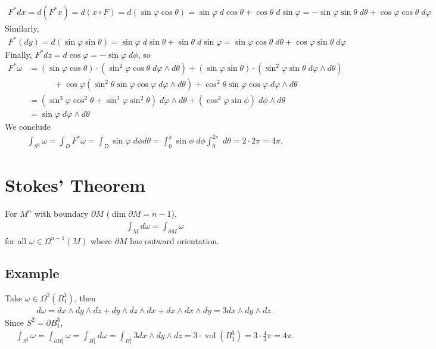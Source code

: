 \documentclass[11pt]{article}
\begin{document}
\begin{align*}
  F^{*}dx
  =d(F^{*}x)
  =d(x\circ F)
  =d(\sin\varphi\cos\theta)
  =\sin\varphi\;d\cos\theta+\cos\theta\;d\sin\varphi
  =-\sin\varphi\sin\theta\;d\theta+\cos\varphi\cos\theta\;d\varphi
\end{align*}
Similarly,\\
\begin{align*}
  F^{*}(dy)
  =d(\sin\varphi\sin\theta)
  =\sin\varphi\;d\sin\theta+\sin\theta\;d\sin\varphi
  =\sin\varphi\cos\theta\;d\theta+\cos\varphi\sin\theta\;d\varphi
\end{align*}
Finally, \(F^{*}dz=d\cos\varphi=-\sin\varphi\;d\phi\), so\\
\begin{align*}
  F^{*}\omega
  &=(\sin\varphi\cos\theta)\cdot(\sin^{2}\varphi\cos\theta\;d\varphi\wedge d\theta)
  +(\sin\varphi\sin\theta)\cdot(\sin^{2}\varphi\sin\theta\;d\varphi\wedge d\theta) \\
  &\hspace{3em}+\cos\varphi(\sin^{2}\theta\sin\varphi\cos\varphi\;d\varphi\wedge d\theta)
  +\cos^{2}\theta\sin\varphi\cos\varphi\;d\varphi\wedge d\theta \\
  &=(\sin^{3}\varphi\cos^{2}\theta+\sin^{3}\varphi\sin^{2}\theta)\;d\varphi\wedge d\theta
  +(\cos^{2}\varphi\sin\phi)\;d\phi\wedge d\theta \\
  &=\sin\varphi\;d\varphi\wedge d\theta
\end{align*}
We conclude\\
\begin{align*}
  \int_{S^{2}}\omega
  =\int_{D}F^{*}\omega
  =\int_{D}\sin\varphi\;d\phi d\theta
  =\int_{0}^{\pi}\sin\phi\;d\phi\int_{0}^{2\pi}\;d\theta
  =2\cdot2\pi
  =4\pi.
\end{align*}
\section*{Stokes' Theorem}
\label{sec:orgdf93926}
For \(M^{n}\) with boundary \(\partial M\) (\(\dim\partial M=n-1\)),\\
\begin{align*}
  \int_{M}d\omega
  =\int_{\partial M}\omega
\end{align*}
for all \(\omega\in\Omega^{n-1}(M)\) where \(\partial M\) has outward orientation.\\
\subsection*{Example}
\label{sec:orgac4593f}
Take \(\omega\in\Omega^{2}(B^{3}_{1})\), then\\
\begin{align*}
  d\omega
  =dx\wedge dy\wedge dz+dy\wedge dz\wedge dx+dx\wedge dx\wedge dy
  =3dx\wedge dy\wedge dz.
\end{align*}
Since \(S^{2}=\partial B_{1}^{3}\),\\
\begin{align*}
  \int_{S^{2}}\omega
  =\int_{\partial B_{1}^{3}}\omega
  =\int_{B_{1}^{3}}d\omega
  =\int_{B_{1}^{3}}3dx\wedge dy\wedge dz
  =3\cdot\operatorname{vol}(B_{1}^{3})
  =3\cdot\frac{4}{3}\pi
  =4\pi.
\end{align*}
\end{document}
